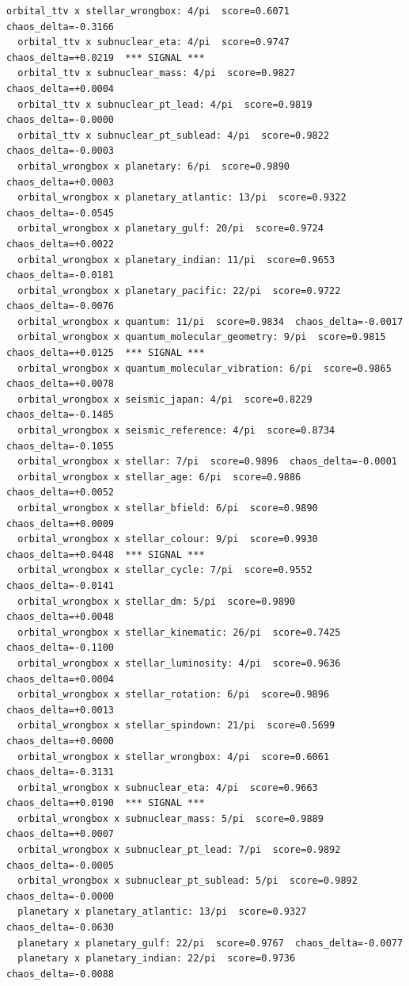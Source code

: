 \documentclass[11pt, letterpaper, openany]{book}
\begin{document}
\begin{empiricalbox}
\begin{lstlisting}[style=terminal]
  orbital_ttv x stellar_wrongbox: 4/pi  score=0.6071  chaos_delta=-0.3166
  orbital_ttv x subnuclear_eta: 4/pi  score=0.9747  chaos_delta=+0.0219  *** SIGNAL ***
  orbital_ttv x subnuclear_mass: 4/pi  score=0.9827  chaos_delta=+0.0004
  orbital_ttv x subnuclear_pt_lead: 4/pi  score=0.9819  chaos_delta=-0.0000
  orbital_ttv x subnuclear_pt_sublead: 4/pi  score=0.9822  chaos_delta=-0.0003
  orbital_wrongbox x planetary: 6/pi  score=0.9890  chaos_delta=+0.0003
  orbital_wrongbox x planetary_atlantic: 13/pi  score=0.9322  chaos_delta=-0.0545
  orbital_wrongbox x planetary_gulf: 20/pi  score=0.9724  chaos_delta=+0.0022
  orbital_wrongbox x planetary_indian: 11/pi  score=0.9653  chaos_delta=-0.0181
  orbital_wrongbox x planetary_pacific: 22/pi  score=0.9722  chaos_delta=-0.0076
  orbital_wrongbox x quantum: 11/pi  score=0.9834  chaos_delta=-0.0017
  orbital_wrongbox x quantum_molecular_geometry: 9/pi  score=0.9815  chaos_delta=+0.0125  *** SIGNAL ***
  orbital_wrongbox x quantum_molecular_vibration: 6/pi  score=0.9865  chaos_delta=+0.0078
  orbital_wrongbox x seismic_japan: 4/pi  score=0.8229  chaos_delta=-0.1485
  orbital_wrongbox x seismic_reference: 4/pi  score=0.8734  chaos_delta=-0.1055
  orbital_wrongbox x stellar: 7/pi  score=0.9896  chaos_delta=-0.0001
  orbital_wrongbox x stellar_age: 6/pi  score=0.9886  chaos_delta=+0.0052
  orbital_wrongbox x stellar_bfield: 6/pi  score=0.9890  chaos_delta=+0.0009
  orbital_wrongbox x stellar_colour: 9/pi  score=0.9930  chaos_delta=+0.0448  *** SIGNAL ***
  orbital_wrongbox x stellar_cycle: 7/pi  score=0.9552  chaos_delta=-0.0141
  orbital_wrongbox x stellar_dm: 5/pi  score=0.9890  chaos_delta=+0.0048
  orbital_wrongbox x stellar_kinematic: 26/pi  score=0.7425  chaos_delta=-0.1100
  orbital_wrongbox x stellar_luminosity: 4/pi  score=0.9636  chaos_delta=+0.0004
  orbital_wrongbox x stellar_rotation: 6/pi  score=0.9896  chaos_delta=+0.0013
  orbital_wrongbox x stellar_spindown: 21/pi  score=0.5699  chaos_delta=+0.0000
  orbital_wrongbox x stellar_wrongbox: 4/pi  score=0.6061  chaos_delta=-0.3131
  orbital_wrongbox x subnuclear_eta: 4/pi  score=0.9663  chaos_delta=+0.0190  *** SIGNAL ***
  orbital_wrongbox x subnuclear_mass: 5/pi  score=0.9889  chaos_delta=+0.0007
  orbital_wrongbox x subnuclear_pt_lead: 7/pi  score=0.9892  chaos_delta=-0.0005
  orbital_wrongbox x subnuclear_pt_sublead: 5/pi  score=0.9892  chaos_delta=-0.0000
  planetary x planetary_atlantic: 13/pi  score=0.9327  chaos_delta=-0.0630
  planetary x planetary_gulf: 22/pi  score=0.9767  chaos_delta=-0.0077
  planetary x planetary_indian: 22/pi  score=0.9736  chaos_delta=-0.0088

\end{lstlisting}
\end{empiricalbox}
\end{document}
